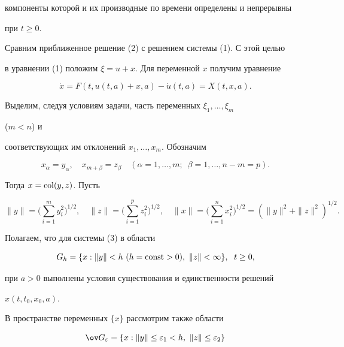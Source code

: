компоненты которой и их производные по времени определены и непрерывны 


при $t\ge 0$. 


 


Сравним приближенное решение (2) с решением системы (1). С этой целью  


в уравнении (1) положим $\xi=u+x$. Для переменной $x$ получим уравнение 


\begin{equation} 


\Dot x=F(t,u(t,a)+x,a)-\Dot u(t,a)=X(t,x,a). 


\end{equation} 





Выделим, следуя условиям задачи, часть переменных $\xi_1,\dotsc,\xi_m$ 


($m<n$) и  


соответствующих им отклонений $x_1,\dotsc,x_m$. Обозначим 


$$ 


x_\alpha=y_\alpha,\quad x_{m+\beta}=z_\beta\quad 


(\alpha=1,\dotsc,m;\ \; \beta=1,\dotsc,n-m=p). 


$$  


Тогда $x=\operatorname{col}(y,z)$. Пусть 


$$ 


\|y\|=\bigg(\sum^m_{i=1}y^2_i\bigg)^{1/2},\quad 


\|z\|=\biggl(\sum^p_{i=1}z^2_i \biggr)^{1/2},\quad 


\|x\|=\biggl(\sum^n_{i=1}x^2_i \biggr)^{1/2}= 


(\|y\|^2+\|z\|^2)^{1/2}. 


$$  


Полагаем, что для системы (3) в области 


\begin{equation} 


G_h=\{x:\|y\|<h\ (h=\const>0),\ \|z\|<\infty\},\ \; t\ge 0, 


\end{equation} 


при $a>0$ выполнены условия существования и единственности решений 


$x(t,t_0,x_0,a)$. 


В пространстве переменных $\{x\}$ рассмотрим также области 


\begin{equation} 


\ov G_\varepsilon=\{x:\|y\|\le\varepsilon_1<h,\ \|z\|\le 


\varepsilon_2\} 


\end{equation} 


